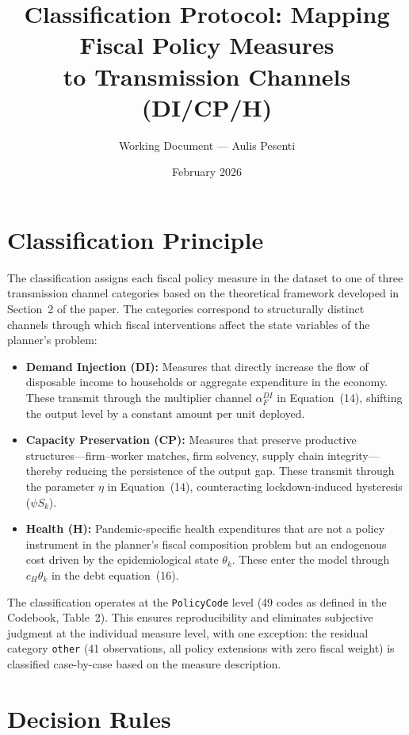 \documentclass[12pt,a4paper]{article}
\title{Classification Protocol: Mapping Fiscal Policy Measures\\to Transmission Channels (DI/CP/H)}
\author{Working Document --- Aulis Pesenti}
\date{February 2026}
\begin{document}
\maketitle

\section{Classification Principle}

The classification assigns each fiscal policy measure in the dataset to one of three
transmission channel categories based on the theoretical framework developed in
Section~2 of the paper. The categories correspond to structurally distinct channels
through which fiscal interventions affect the state variables of the planner's problem:

\begin{itemize}[leftmargin=2em]
  \item \textbf{Demand Injection (DI):} Measures that directly increase the flow of
    disposable income to households or aggregate expenditure in the economy. These
    transmit through the multiplier channel $\alpha_F^{DI}$ in Equation~(14), shifting
    the output level by a constant amount per unit deployed.
  \item \textbf{Capacity Preservation (CP):} Measures that preserve productive
    structures---firm--worker matches, firm solvency, supply chain integrity---thereby
    reducing the persistence of the output gap. These transmit through the parameter
    $\eta$ in Equation~(14), counteracting lockdown-induced hysteresis ($\psi S_k$).
  \item \textbf{Health (H):} Pandemic-specific health expenditures that are not a
    policy instrument in the planner's fiscal composition problem but an endogenous
    cost driven by the epidemiological state $\theta_k$. These enter the model through
    $c_H \theta_k$ in the debt equation~(16).
\end{itemize}

\noindent The classification operates at the \texttt{PolicyCode} level (49 codes as defined
in the Codebook, Table~2). This ensures reproducibility and eliminates subjective
judgment at the individual measure level, with one exception: the residual category
\texttt{other} (41 observations, all policy extensions with zero fiscal weight) is
classified case-by-case based on the measure description.

\section{Decision Rules}
\end{document}
